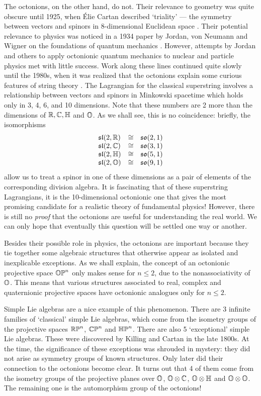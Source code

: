 The octonions, on the other hand, do not.  Their relevance to geometry
was quite obscure until 1925, when \'Elie Cartan described `triality'
--- the symmetry between vectors and spinors in 8-dimensional Euclidean
space \cite{Cartan3}.  Their potential relevance to physics was noticed
in a 1934 paper by Jordan, von Neumann and Wigner on the foundations of
quantum mechanics \cite{JNW}.  However, attempts by Jordan and others to
apply octonionic quantum mechanics to nuclear and particle physics met
with little success.  Work along these lines continued quite slowly
until the 1980s, when it was realized that the octonions explain some
curious features of string theory \cite{KT}.  The Lagrangian for
the classical superstring involves a relationship between vectors and
spinors in Minkowski spacetime which holds only in 3, 4, 6, and 10
dimensions.  Note that these numbers are 2 more than the dimensions of
${\mathbb R},{\mathbb C},{\mathbb H}$ and ${\mathbb O}$.  As we shall see, this is no coincidence: briefly, 
the isomorphisms 
\[ \begin{array}{lcl}
          {\mathfrak {sl}}(2,{\mathbb R}) &\cong& {\mathfrak {so}}(2,1)   \\
          {\mathfrak {sl}}(2,{\mathbb C}) &\cong& {\mathfrak {so}}(3,1)   \\   
          {\mathfrak {sl}}(2,{\mathbb H}) &\cong& {\mathfrak {so}}(5,1)   \\
          {\mathfrak {sl}}(2,{\mathbb O}) &\cong& {\mathfrak {so}}(9,1)   
\end{array}
\]
allow us to treat a spinor in one of these dimensions as a pair of   
elements of the corresponding division algebra.  It is fascinating   
that of these superstring Lagrangians, it is the 10-dimensional
octonionic one that gives the most promising candidate for a realistic
theory of fundamental physics!  However, there is still no {\it proof}
that the octonions are useful for understanding the real world.  We
can only hope that eventually this question will be settled one way or
another.

Besides their possible role in physics, the octonions are important   
because they tie together some algebraic structures that otherwise   
appear as isolated and inexplicable exceptions.  As we shall explain,   
the concept of an octonionic projective space ${\mathbb {OP}}^n$ only makes sense   
for $n \le 2$, due to the nonassociativity of ${\mathbb O}$.  This means that   
various structures associated to real, complex and quaternionic   
projective spaces have octonionic analogues only for $n \le 2$.    
   
Simple Lie algebras are a nice example of this phenomenon.   There are  
3 infinite families of `classical' simple Lie algebras, which come from
the isometry groups of the projective spaces ${\mathbb {RP}}^n$, ${\mathbb {CP}}^n$ and   
${\mathbb {HP}}^n$.  There are also 5 `exceptional' simple Lie algebras.   These 
were discovered by Killing and Cartan in the late 1800s.  At the time,
the significance of these exceptions was shrouded in mystery: they did
not arise as symmetry groups of known structures.  Only later did their
connection to the octonions become clear.  It turns out that 4 of them
come from the isometry groups of the projective planes over ${\mathbb O}$, ${\mathbb O}
\otimes {\mathbb C}$, ${\mathbb O} \otimes {\mathbb H}$ and ${\mathbb O}  \otimes {\mathbb O}$.  The remaining one is
the automorphism group of the octonions!   
   
